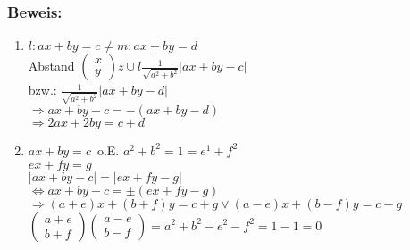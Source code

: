 \subsubsection{Beweis:}
\begin{enumerate}
	\item $l:ax+by=c \neq m:ax+by=d$\\
	Abstand $\begin{pmatrix} x \\ y\end{pmatrix} z \cup l \frac{1}{\sqrt{a^{2}+b^{2}}} |
	ax+by-c|$\\
	bzw.: $\frac{1}{\sqrt{a^{2}+b^{2}}}|ax+by-d|$\\
	$\Rightarrow ax+by-c=-(ax+by-d)$\\
	$\Rightarrow 2ax+2by=c+d$
	\item $ax+by=c \,$ o.E. $a^{2}+b^{2}=1=e^{1}+f^{2}$\\
	$ex+fy=g$\\
	$|ax+by-c|=|ex+fy-g|$\\
	$\Leftrightarrow ax+by-c=\pm(ex+fy-g)$\\
	$\Rightarrow (a+e)x+(b+f)y=c+g \vee (a-e)x+(b-f)y=c-g$\\
	$\begin{pmatrix} a+e \\ b+f \end{pmatrix} \begin{pmatrix} a-e \\ b-f \end{pmatrix} = 
	a^{2}+b^{2}-e^{2}-f^{2}=1-1=0$
\end{enumerate}
